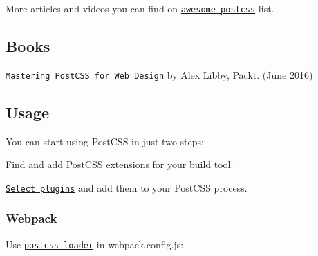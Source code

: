 More articles and videos you can find on \href{https://github.com/jjaderg/awesome-postcss}{\tt awesome-\/postcss} list.

\subsection*{Books}


\begin{DoxyItemize}
\item \href{https://www.packtpub.com/web-development/mastering-postcss-web-design}{\tt Mastering Post\+C\+SS for Web Design} by Alex Libby, Packt. (June 2016)
\end{DoxyItemize}

\subsection*{Usage}

You can start using Post\+C\+SS in just two steps\+:


\begin{DoxyEnumerate}
\item Find and add Post\+C\+SS extensions for your build tool.
\item \href{http://postcss.parts}{\tt Select plugins} and add them to your Post\+C\+SS process.
\end{DoxyEnumerate}

\subsubsection*{Webpack}

Use \href{https://github.com/postcss/postcss-loader}{\tt {\ttfamily postcss-\/loader}} in {\ttfamily webpack.\+config.\+js}\+:




